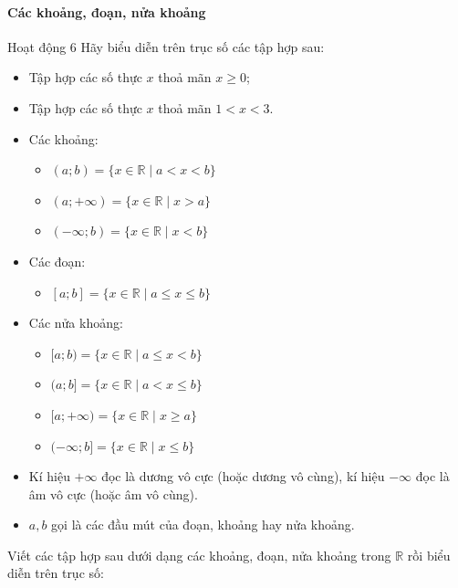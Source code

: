 \begin{kienthuc}
	\paragraph{Các khoảng, đoạn, nửa khoảng}
	\begin{hoatdong}{Hoạt động 6}
		Hãy biểu diễn trên trục số các tập hợp sau:
		\begin{itemize}
			\item[a)] Tập hợp các số thực $x$ thoả mãn $x \ge 0$;
			\item[b)] Tập hợp các số thực $x$ thoả mãn $1 < x < 3$.
		\end{itemize}
	\end{hoatdong}
	\begin{itemize}
		\item Các khoảng:
		\begin{itemize}
			\item $(a; b) = \{x \in \mathbb{R} \mid a < x < b\}$
			\item $(a; +\infty) = \{x \in \mathbb{R} \mid x > a\}$
			\item $(-\infty; b) = \{x \in \mathbb{R} \mid x < b\}$
		\end{itemize}
		\item Các đoạn:
		\begin{itemize}
			\item $[a; b] = \{x \in \mathbb{R} \mid a \le x \le b\}$
		\end{itemize}
		\item Các nửa khoảng:
		\begin{itemize}
			\item $[a; b) = \{x \in \mathbb{R} \mid a \le x < b\}$
			\item $(a; b] = \{x \in \mathbb{R} \mid a < x \le b\}$
			\item $[a; +\infty) = \{x \in \mathbb{R} \mid x \ge a\}$
			\item $(-\infty; b] = \{x \in \mathbb{R} \mid x \le b\}$
		\end{itemize}
		\item Kí hiệu $+\infty$ đọc là dương vô cực (hoặc dương vô cùng), kí hiệu $-\infty$ đọc là âm vô cực (hoặc âm vô cùng).
		\item $a, b$ gọi là các đầu mút của đoạn, khoảng hay nửa khoảng.
	\end{itemize}
	\begin{vd}
		Viết các tập hợp sau dưới dạng các khoảng, đoạn, nửa khoảng trong $\mathbb{R}$ rồi biểu diễn trên trục số:

\end{vd}
\end{kienthuc}
